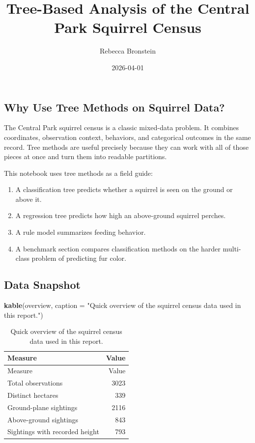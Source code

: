\documentclass[
  11pt,
]{article}
\title{Tree-Based Analysis of the Central Park Squirrel Census}
\author{Rebecca Bronstein}
\date{2026-04-01}
\newenvironment{Shaded}{\begin{snugshade}}{\end{snugshade}}
\newcommand{\AttributeTok}[1]{\textcolor[rgb]{0.13,0.29,0.53}{#1}}
\newcommand{\FunctionTok}[1]{\textcolor[rgb]{0.13,0.29,0.53}{\textbf{#1}}}
\newcommand{\NormalTok}[1]{#1}
\newcommand{\StringTok}[1]{\textcolor[rgb]{0.31,0.60,0.02}{#1}}
\providecommand{\tightlist}{%
  \setlength{\itemsep}{0pt}\setlength{\parskip}{0pt}}
\begin{document}
\maketitle

{
\setcounter{tocdepth}{2}
\tableofcontents
}
\subsection{Why Use Tree Methods on Squirrel
Data?}\label{why-use-tree-methods-on-squirrel-data}

The Central Park squirrel census is a classic mixed-data problem. It
combines coordinates, observation context, behaviors, and categorical
outcomes in the same record. Tree methods are useful precisely because
they can work with all of those pieces at once and turn them into
readable partitions.

This notebook uses tree methods as a field guide:

\begin{enumerate}
\def\labelenumi{\arabic{enumi}.}
\tightlist
\item
  A classification tree predicts whether a squirrel is seen on the
  ground or above it.
\item
  A regression tree predicts how high an above-ground squirrel perches.
\item
  A rule model summarizes feeding behavior.
\item
  A benchmark section compares classification methods on the harder
  multi-class problem of predicting fur color.
\end{enumerate}

\subsection{Data Snapshot}\label{data-snapshot}

\begin{Shaded}
\begin{Highlighting}[]
\FunctionTok{kable}\NormalTok{(overview, }\AttributeTok{caption =} \StringTok{"Quick overview of the squirrel census data used in this report."}\NormalTok{)}
\end{Highlighting}
\end{Shaded}

\begin{longtable}[]{@{}lr@{}}
\caption{Quick overview of the squirrel census data used in this
report.}\tabularnewline
\toprule\noalign{}
Measure & Value \\
\midrule\noalign{}
\endfirsthead
\toprule\noalign{}
Measure & Value \\
\midrule\noalign{}
\endhead
\bottomrule\noalign{}
\endlastfoot
Total observations & 3023 \\
Distinct hectares & 339 \\
Ground-plane sightings & 2116 \\
Above-ground sightings & 843 \\
Sightings with recorded height & 793 \\
\end{longtable}
\end{document}
